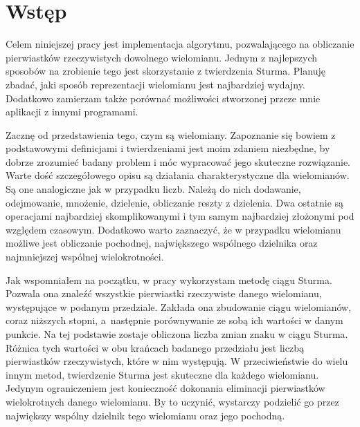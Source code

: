 \chapter{Wstęp}

Celem niniejszej pracy jest implementacja algorytmu, pozwalającego na obliczanie pierwiastków rzeczywistych dowolnego wielomianu. Jednym z najlepszych sposobów na zrobienie tego jest skorzystanie z twierdzenia Sturma. Planuję zbadać, jaki sposób reprezentacji wielomianu jest najbardziej wydajny. Dodatkowo zamierzam także porównać możliwości stworzonej przeze mnie aplikacji z innymi programami.

Zacznę od przedstawienia tego, czym są wielomiany. Zapoznanie się bowiem z podstawowymi definicjami i twierdzeniami jest moim zdaniem niezbędne, by dobrze zrozumieć badany problem i móc wypracować jego skuteczne rozwiązanie. Warte dość szczegółowego opisu są działania charakterystyczne dla wielomianów. Są one analogiczne jak w przypadku liczb. Należą do nich dodawanie, odejmowanie, mnożenie, dzielenie, obliczanie reszty z dzielenia. Dwa ostatnie są operacjami najbardziej skomplikowanymi i tym samym najbardziej złożonymi pod względem czasowym. Dodatkowo warto zaznaczyć, że w przypadku wielomianu możliwe jest obliczanie pochodnej, największego wspólnego dzielnika oraz najmniejszej wspólnej wielokrotności.

Jak wspomniałem na początku, w pracy wykorzystam metodę ciągu Sturma. Pozwala ona znaleźć wszystkie pierwiastki rzeczywiste danego wielomianu, występujące w podanym przedziale. Zakłada ona zbudowanie ciągu wielomianów, coraz niższych stopni, a~następnie porównywanie ze sobą ich wartości w danym punkcie. Na tej podstawie zostaje obliczona liczba zmian znaku w ciągu Sturma. Różnica tych wartości w obu krańcach badanego przedziału jest liczbą pierwiastków rzeczywistych, które w nim występują. W przeciwieństwie do wielu innym metod, twierdzenie Sturma jest skuteczne dla każdego wielomianu. Jedynym ograniczeniem jest konieczność dokonania eliminacji pierwiastków wielokrotnych danego wielomianu. By to uczynić, wystarczy podzielić go przez największy wspólny dzielnik tego wielomianu oraz jego pochodną.


